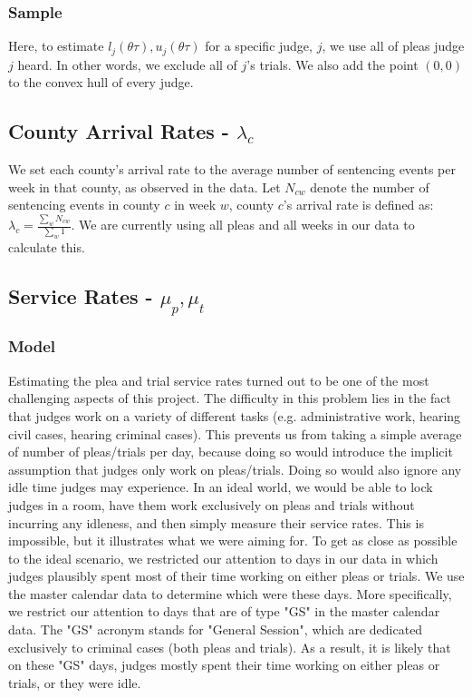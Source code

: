 \documentclass[11pt, oneside]{article}   	%
\theoremstyle{ModifiedStyle}
\begin{document}
    \subsubsection{Sample}
      Here, to estimate $l_j(\theta \tau),u_j(\theta \tau)$ for a specific judge, $j$, we use all of pleas judge $j$ heard. In other words, we exclude all of $j$'s trials. We also add the point $(0,0)$ to the convex hull of every judge.

  \subsection{County Arrival Rates - $\lambda_c$}
    \label{lambda_c-estimation}
    We set each county's arrival rate to the average number of sentencing events per week in that county, as observed in the data. Let $N_{cw}$ denote the number of sentencing events in county $c$ in week $w$, county $c$'s arrival rate is defined as: $\lambda_c = \frac{\sum_w N_{cw}}{\sum_w 1}$. We are currently using all pleas and all weeks in our data to calculate this.

  \subsection{Service Rates - $\mu_p,\mu_t$}
    \label{service-rate-estimation}
		\subsubsection{Model}
	    Estimating the plea and trial service rates turned out to be one of the most challenging
			aspects of this project. The difficulty in this problem lies in the fact that judges
			work on a variety of different tasks (e.g. administrative work, hearing civil cases, hearing criminal cases).
			This prevents us from taking a simple average of number of pleas/trials per day, because doing so would
			introduce the implicit assumption that judges only work on pleas/trials. Doing so would also ignore any idle time judges may experience. In an ideal world,
			we would be able to lock judges in a room, have them work exclusively on pleas and trials without incurring any idleness, and
			then simply measure their service rates. This is impossible, but it illustrates what we were aiming for.
			To get as close as possible to the ideal scenario, we restricted our attention to days in our data in which
			judges plausibly spent most of their time working on either pleas or trials. We use the master calendar data
			to determine which were these days. More specifically, we restrict our attention to days that are of type "GS" in
			the master calendar data. The "GS" acronym stands for "General Session", which are dedicated exclusively to criminal
			cases (both pleas and trials). As a result, it is likely that on these "GS" days, judges mostly spent their time working on either pleas or trials, or they were idle.
\end{document}
